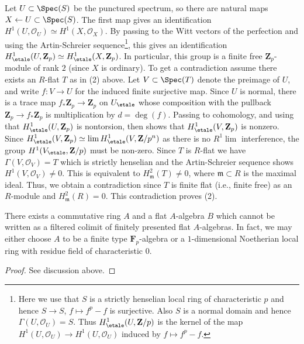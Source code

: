 \medskip\noindent
Let $U \subset \Spec(S)$ be the punctured spectrum, so there are natural
maps $X \leftarrow U \subset \Spec(S)$. The first map gives an
identification $H^1(U, \mathcal{O}_U) \simeq H^1(X, \mathcal{O}_X)$.
By passing to the Witt vectors of the perfection and using the
Artin-Schreier sequence\footnote{Here we use that $S$ is a strictly
henselian local ring of characteristic $p$ and hence
$S \to S$, $f \mapsto f^p - f$ is surjective.
Also $S$ is a normal domain and hence
$\Gamma(U, \mathcal{O}_U) = S$. Thus $H^1_\etale(U, \mathbf{Z}/p)$
is the kernel of the map $H^1(U, \mathcal{O}_U) \to H^1(U, \mathcal{O}_U)$
induced by $f \mapsto f^p - f$.}, this gives an identification
$H^1_\etale(U, \mathbf{Z}_p) \simeq H^1_\etale(X, \mathbf{Z}_p)$.
In particular, this group is a finite free $\mathbf{Z}_p$-module of
rank $2$ (since $X$ is ordinary). To get a contradiction assume
there exists an
$R$-flat $T$ as in (2) above. Let $V \subset \Spec(T)$ denote the preimage
of $U$, and write $f : V \to U$ for the induced finite surjective map.
Since $U$ is normal, there is a trace map $f_*\mathbf{Z}_p \to \mathbf{Z}_p$
on $U_\etale$ whose composition with the pullback
$\mathbf{Z}_p \to f_*\mathbf{Z}_p$ is multiplication by $d = \deg(f)$.
Passing to cohomology, and using that $H^1_\etale(U, \mathbf{Z}_p)$
is nontorsion, then shows that $H^1_\etale(V, \mathbf{Z}_p)$ is nonzero.
Since $H^1_\etale(V, \mathbf{Z}_p) \simeq \lim H^1_\etale(V, \mathbf{Z}/p^n)$
as there is no $R^1\lim$ interference, the group
$H^1(V_\etale,\mathbf{Z}/p)$ must be non-zero. Since $T$ is $R$-flat we
have $\Gamma(V, \mathcal{O}_V) = T$ which is strictly henselian and the
Artin-Schreier sequence shows $H^1(V, \mathcal{O}_V) \neq 0$.
This is equivalent to $H^2_\mathfrak m(T) \neq 0$, where
$\mathfrak m \subset R$ is the maximal ideal. Thus, we obtain
a contradiction since $T$ is finite flat (i.e., finite free) as an
$R$-module and $H^2_\mathfrak m(R) = 0$. This contradiction proves (2).

\begin{lemma}
\label{lemma-weird-flat-map}
There exists a commutative ring $A$ and a flat $A$-algebra $B$
which cannot be written as a filtered colimit of finitely
presented flat $A$-algebras. In fact, we may either choose $A$ to
be a finite type $\mathbf{F}_p$-algebra or a $1$-dimensional
Noetherian local ring with residue field of characteristic $0$.
\end{lemma}

\begin{proof}
See discussion above.
\end{proof}




